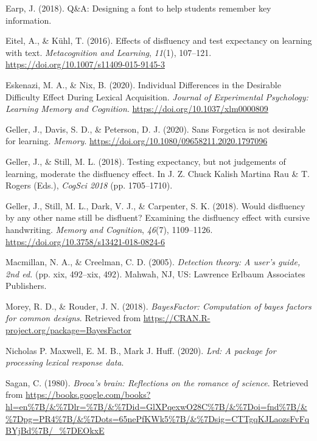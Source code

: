 \documentclass[
  english,
  man]{apa6}
\begin{document}
\leavevmode\hypertarget{ref-Earp2018}{}%
Earp, J. (2018). Q\&A: Designing a font to help students remember key information.

\leavevmode\hypertarget{ref-Eitel2016}{}%
Eitel, A., \& Kühl, T. (2016). Effects of disfluency and test expectancy on learning with text. \emph{Metacognition and Learning}, \emph{11}(1), 107--121. \url{https://doi.org/10.1007/s11409-015-9145-3}

\leavevmode\hypertarget{ref-Eskenazi2020}{}%
Eskenazi, M. A., \& Nix, B. (2020). Individual Differences in the Desirable Difficulty Effect During Lexical Acquisition. \emph{Journal of Experimental Psychology: Learning Memory and Cognition}. \url{https://doi.org/10.1037/xlm0000809}

\leavevmode\hypertarget{ref-Geller2020}{}%
Geller, J., Davis, S. D., \& Peterson, D. J. (2020). Sans Forgetica is not desirable for learning. \emph{Memory}. \url{https://doi.org/10.1080/09658211.2020.1797096}

\leavevmode\hypertarget{ref-cogsci18-Geller}{}%
Geller, J., \& Still, M. L. (2018). Testing expectancy, but not judgements of learning, moderate the disfluency effect. In J. Z. Chuck Kalish Martina Rau \& T. Rogers (Eds.), \emph{CogSci 2018} (pp. 1705--1710).

\leavevmode\hypertarget{ref-Geller2018}{}%
Geller, J., Still, M. L., Dark, V. J., \& Carpenter, S. K. (2018). Would disfluency by any other name still be disfluent? Examining the disfluency effect with cursive handwriting. \emph{Memory and Cognition}, \emph{46}(7), 1109--1126. \url{https://doi.org/10.3758/s13421-018-0824-6}

\leavevmode\hypertarget{ref-Macmillan2005}{}%
Macmillan, N. A., \& Creelman, C. D. (2005). \emph{Detection theory: A user's guide, 2nd ed.} (pp. xix, 492--xix, 492). Mahwah, NJ, US: Lawrence Erlbaum Associates Publishers.

\leavevmode\hypertarget{ref-Morey2018}{}%
Morey, R. D., \& Rouder, J. N. (2018). \emph{BayesFactor: Computation of bayes factors for common designs}. Retrieved from \url{https://CRAN.R-project.org/package=BayesFactor}

\leavevmode\hypertarget{ref-Maxwell2020}{}%
Nicholas P. Maxwell, E. M. B., Mark J. Huff. (2020). \emph{Lrd: A package for processing lexical response data}.

\leavevmode\hypertarget{ref-Sagan1980}{}%
Sagan, C. (1980). \emph{Broca's brain: Reflections on the romance of science}. Retrieved from \url{https://books.google.com/books?hl=en\%7B/\&\%7Dlr=\%7B/\&\%7Did=GlXPqexwO28C\%7B/\&\%7Doi=fnd\%7B/\&\%7Dpg=PR4\%7B/\&\%7Dots=65nePfKWk5\%7B/\&\%7Dsig=CTTgqKJLaozsFvFqBYjBd\%7B/_\%7DEOkxE}
\end{document}
